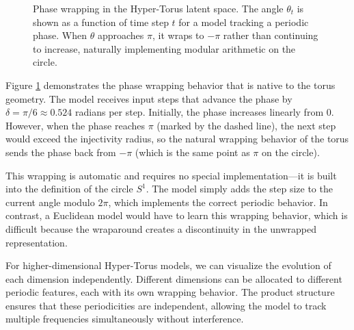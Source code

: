 \documentclass[12pt,letterpaper,twoside]{article}
\begin{document}
\begin{figure}[htbp]
    \caption{Phase wrapping in the Hyper-Torus latent space. The angle $\theta_t$ is shown as a function of time step $t$ for a model tracking a periodic phase. When $\theta$ approaches $\pi$, it wraps to $-\pi$ rather than continuing to increase, naturally implementing modular arithmetic on the circle.}
    \label{fig:phase}
\end{figure}

Figure \ref{fig:phase} demonstrates the phase wrapping behavior that is native to the torus geometry. The model receives input steps that advance the phase by $\delta = \pi/6 \approx 0.524$ radians per step. Initially, the phase increases linearly from 0. However, when the phase reaches $\pi$ (marked by the dashed line), the next step would exceed the injectivity radius, so the natural wrapping behavior of the torus sends the phase back from $-\pi$ (which is the same point as $\pi$ on the circle).

This wrapping is automatic and requires no special implementation—it is built into the definition of the circle $S^1$. The model simply adds the step size to the current angle modulo $2\pi$, which implements the correct periodic behavior. In contrast, a Euclidean model would have to learn this wrapping behavior, which is difficult because the wraparound creates a discontinuity in the unwrapped representation.

For higher-dimensional Hyper-Torus models, we can visualize the evolution of each dimension independently. Different dimensions can be allocated to different periodic features, each with its own wrapping behavior. The product structure ensures that these periodicities are independent, allowing the model to track multiple frequencies simultaneously without interference.
\end{document}
